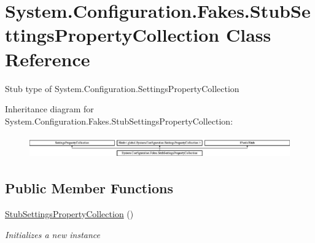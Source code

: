 \hypertarget{class_system_1_1_configuration_1_1_fakes_1_1_stub_settings_property_collection}{\section{System.\-Configuration.\-Fakes.\-Stub\-Settings\-Property\-Collection Class Reference}
\label{class_system_1_1_configuration_1_1_fakes_1_1_stub_settings_property_collection}
}


Stub type of System.\-Configuration.\-Settings\-Property\-Collection 


Inheritance diagram for System.\-Configuration.\-Fakes.\-Stub\-Settings\-Property\-Collection\-:\begin{figure}[H]
\begin{center}
\leavevmode
\includegraphics[height=0.974761cm]{class_system_1_1_configuration_1_1_fakes_1_1_stub_settings_property_collection}
\end{center}
\end{figure}
\subsection*{Public Member Functions}
\begin{DoxyCompactItemize}
\item 
\hyperlink{class_system_1_1_configuration_1_1_fakes_1_1_stub_settings_property_collection_a26c2f3fa9a93f35f11c8b2cab8ce577d}{Stub\-Settings\-Property\-Collection} ()
\begin{DoxyCompactList}\small\item\em Initializes a new instance\end{DoxyCompactList}\end{DoxyCompactItemize}
